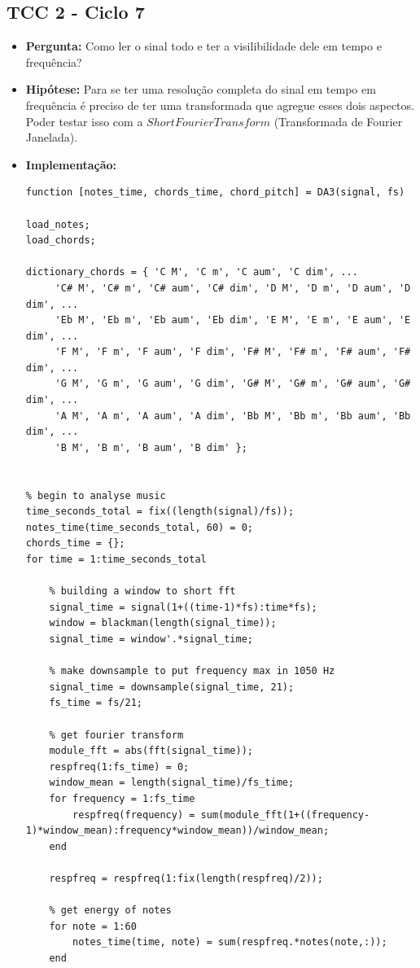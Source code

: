 \subsection{TCC 2 - Ciclo 7}
\begin{itemize}
\item \textbf{Pergunta:} Como ler o sinal todo e ter a visilibilidade dele em tempo e frequência?
\item \textbf{Hipótese:} Para se ter uma resolução completa do sinal em tempo em frequência é preciso de ter uma transformada que agregue esses dois aspectos. Poder testar isso com a $Short Fourier Transform$ (Transformada de Fourier Janelada).   
\item \textbf{Implementação:} 
\begin{lstlisting}
function [notes_time, chords_time, chord_pitch] = DA3(signal, fs)

load_notes;
load_chords;

dictionary_chords = { 'C M', 'C m', 'C aum', 'C dim', ...
     'C# M', 'C# m', 'C# aum', 'C# dim', 'D M', 'D m', 'D aum', 'D dim', ...
     'Eb M', 'Eb m', 'Eb aum', 'Eb dim', 'E M', 'E m', 'E aum', 'E dim', ...
     'F M', 'F m', 'F aum', 'F dim', 'F# M', 'F# m', 'F# aum', 'F# dim', ...
     'G M', 'G m', 'G aum', 'G dim', 'G# M', 'G# m', 'G# aum', 'G# dim', ...
     'A M', 'A m', 'A aum', 'A dim', 'Bb M', 'Bb m', 'Bb aum', 'Bb dim', ...
     'B M', 'B m', 'B aum', 'B dim' };


% begin to analyse music
time_seconds_total = fix((length(signal)/fs));
notes_time(time_seconds_total, 60) = 0;
chords_time = {};
for time = 1:time_seconds_total

    % building a window to short fft 
    signal_time = signal(1+((time-1)*fs):time*fs);
    window = blackman(length(signal_time));
    signal_time = window'.*signal_time;
    
    % make downsample to put frequency max in 1050 Hz
    signal_time = downsample(signal_time, 21);
    fs_time = fs/21;

    % get fourier transform
    module_fft = abs(fft(signal_time));
    respfreq(1:fs_time) = 0;
    window_mean = length(signal_time)/fs_time;
    for frequency = 1:fs_time
        respfreq(frequency) = sum(module_fft(1+((frequency-1)*window_mean):frequency*window_mean))/window_mean;
    end

    respfreq = respfreq(1:fix(length(respfreq)/2));

    % get energy of notes
    for note = 1:60
        notes_time(time, note) = sum(respfreq.*notes(note,:));    
    end


\end{lstlisting}
\end{itemize}
